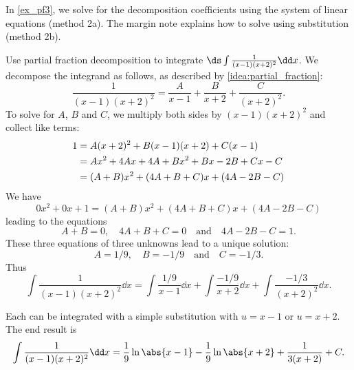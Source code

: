In \autoref{ex_pf3}, we solve for the decomposition coefficients using the system of linear equations (method 2a). The margin note explains how to solve using substitution (method 2b).

\begin{example}\label{ex_pf3}
Use partial fraction decomposition to integrate $\ds\int\frac{1}{(x-1)(x+2)^2}\dd x$.
\solution
We decompose the integrand as follows, as described by \autoref{idea:partial_fraction}:
\begin{equation}\label{eq:decomp3}
 \frac{1}{(x-1)(x+2)^2} = \frac{A}{x-1} + \frac{B}{x+2} + \frac{C}{(x+2)^2}.
\end{equation}
To solve for $A$, $B$ and $C$, we multiply both sides by $(x-1)(x+2)^2$ and collect like terms:
%
%
\begin{align}
	1
	&= A(x+2)^2 + B(x-1)(x+2) + C(x-1)\label{eq:pf3}\\
	&= Ax^2+4Ax+4A + Bx^2 + Bx-2B + Cx-C \notag \\
	&= (A+B)x^2 + (4A+B+C)x + (4A-2B-C)\notag
\end{align}
We have
\[0x^2+0x+ 1 = (A+B)x^2 + (4A+B+C)x + (4A-2B-C)\]
leading to the equations 
\[A+B = 0, \quad 4A+B+C = 0 \quad \text{and} \quad 4A-2B-C = 1.\]
These three equations of three unknowns lead to a unique solution:
\[A = 1/9,\quad B = -1/9 \quad \text{and} \quad C = -1/3.\]
Thus 
\[
\int\frac{1}{(x-1)(x+2)^2}\dd x = \int \frac{1/9}{x-1}\dd x + \int \frac{-1/9}{x+2}\dd x + \int \frac{-1/3}{(x+2)^2}\dd x.
\]

Each can be integrated with a simple substitution with $u=x-1$ or $u=x+2$.
The end result is
\[\int\frac{1}{(x-1)(x+2)^2}\dd x = \frac19\ln\abs{x-1}-\frac19\ln\abs{x+2} +\frac1{3(x+2)}+C.\]
\end{example}

